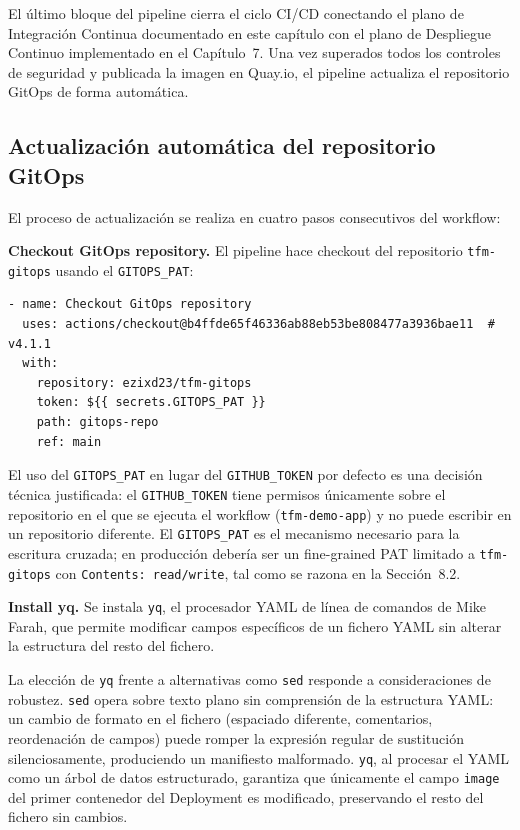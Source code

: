 El último bloque del pipeline cierra el ciclo CI/CD conectando el plano de Integración Continua documentado en este capítulo con el plano de Despliegue Continuo implementado en el Capítulo~7. Una vez superados todos los controles de seguridad y publicada la imagen en Quay.io, el pipeline actualiza el repositorio GitOps de forma automática.

\subsection{Actualización automática del repositorio GitOps}

El proceso de actualización se realiza en cuatro pasos consecutivos del workflow:

\textbf{Checkout GitOps repository.} El pipeline hace checkout del repositorio \texttt{tfm-gitops} usando el \texttt{GITOPS\_PAT}:

\begin{lstlisting}
- name: Checkout GitOps repository
  uses: actions/checkout@b4ffde65f46336ab88eb53be808477a3936bae11  # v4.1.1
  with:
    repository: ezixd23/tfm-gitops
    token: ${{ secrets.GITOPS_PAT }}
    path: gitops-repo
    ref: main
\end{lstlisting}

El uso del \texttt{GITOPS\_PAT} en lugar del \texttt{GITHUB\_TOKEN} por defecto es una decisión técnica justificada: el \texttt{GITHUB\_TOKEN} tiene permisos únicamente sobre el repositorio en el que se ejecuta el workflow (\texttt{tfm-demo-app}) y no puede escribir en un repositorio diferente. El \texttt{GITOPS\_PAT} es el mecanismo necesario para la escritura cruzada; en producción debería ser un fine-grained PAT limitado a \texttt{tfm-gitops} con \texttt{Contents: read/write}, tal como se razona en la Sección~8.2.

\textbf{Install yq.} Se instala \texttt{yq}, el procesador YAML de línea de comandos de Mike Farah, que permite modificar campos específicos de un fichero YAML sin alterar la estructura del resto del fichero.

La elección de \texttt{yq} frente a alternativas como \texttt{sed} responde a consideraciones de robustez. \texttt{sed} opera sobre texto plano sin comprensión de la estructura YAML: un cambio de formato en el fichero (espaciado diferente, comentarios, reordenación de campos) puede romper la expresión regular de sustitución silenciosamente, produciendo un manifiesto malformado. \texttt{yq}, al procesar el YAML como un árbol de datos estructurado, garantiza que únicamente el campo \texttt{image} del primer contenedor del Deployment es modificado, preservando el resto del fichero sin cambios.


